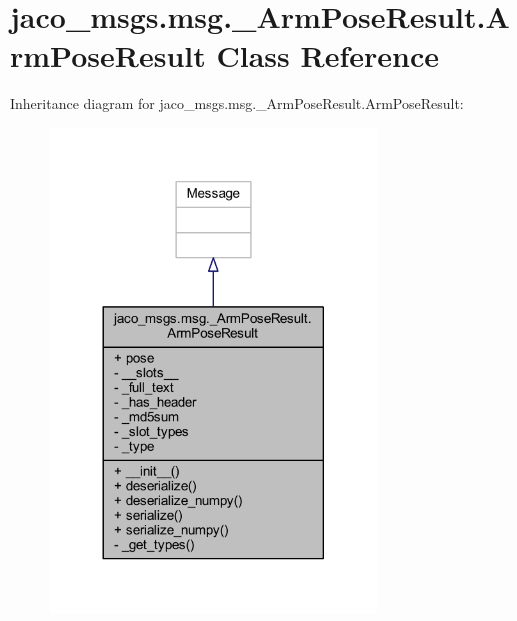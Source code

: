 \hypertarget{classjaco__msgs_1_1msg_1_1__ArmPoseResult_1_1ArmPoseResult}{}\section{jaco\+\_\+msgs.\+msg.\+\_\+\+Arm\+Pose\+Result.\+Arm\+Pose\+Result Class Reference}
\label{classjaco__msgs_1_1msg_1_1__ArmPoseResult_1_1ArmPoseResult}


Inheritance diagram for jaco\+\_\+msgs.\+msg.\+\_\+\+Arm\+Pose\+Result.\+Arm\+Pose\+Result\+:
\nopagebreak
\begin{figure}[H]
\begin{center}
\leavevmode
\includegraphics[width=245pt]{d0/dd5/classjaco__msgs_1_1msg_1_1__ArmPoseResult_1_1ArmPoseResult__inherit__graph}
\end{center}
\end{figure}


